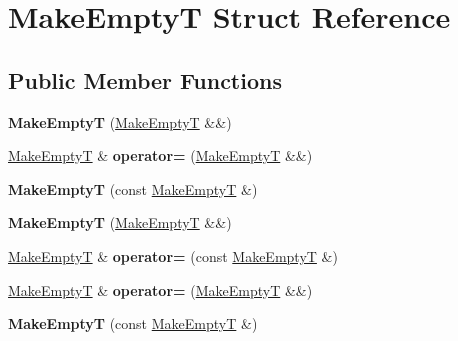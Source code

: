 \hypertarget{struct_make_empty_t}{}\section{Make\+EmptyT Struct Reference}
\label{struct_make_empty_t}
\subsection*{Public Member Functions}
\begin{DoxyCompactItemize}
\item 
\mbox{\label{struct_make_empty_t_a17aba80a25e892545da341b6ca785bac}} 
{\bfseries Make\+EmptyT} (\mbox{\hyperlink{struct_make_empty_t}{Make\+EmptyT}} \&\&)
\item 
\mbox{\label{struct_make_empty_t_a15d3ed474f747901490d5ccaf96fdaae}} 
\mbox{\hyperlink{struct_make_empty_t}{Make\+EmptyT}} \& {\bfseries operator=} (\mbox{\hyperlink{struct_make_empty_t}{Make\+EmptyT}} \&\&)
\item 
\mbox{\label{struct_make_empty_t_acd09df79c616a24591a2cfc077a03a54}} 
{\bfseries Make\+EmptyT} (const \mbox{\hyperlink{struct_make_empty_t}{Make\+EmptyT}} \&)
\item 
\mbox{\label{struct_make_empty_t_a17aba80a25e892545da341b6ca785bac}} 
{\bfseries Make\+EmptyT} (\mbox{\hyperlink{struct_make_empty_t}{Make\+EmptyT}} \&\&)
\item 
\mbox{\label{struct_make_empty_t_ae6127c67204ecde7fc258957bf158556}} 
\mbox{\hyperlink{struct_make_empty_t}{Make\+EmptyT}} \& {\bfseries operator=} (const \mbox{\hyperlink{struct_make_empty_t}{Make\+EmptyT}} \&)
\item 
\mbox{\label{struct_make_empty_t_a15d3ed474f747901490d5ccaf96fdaae}} 
\mbox{\hyperlink{struct_make_empty_t}{Make\+EmptyT}} \& {\bfseries operator=} (\mbox{\hyperlink{struct_make_empty_t}{Make\+EmptyT}} \&\&)
\item 
\mbox{\label{struct_make_empty_t_acd09df79c616a24591a2cfc077a03a54}} 
{\bfseries Make\+EmptyT} (const \mbox{\hyperlink{struct_make_empty_t}{Make\+EmptyT}} \&)

\end{DoxyCompactItemize}
